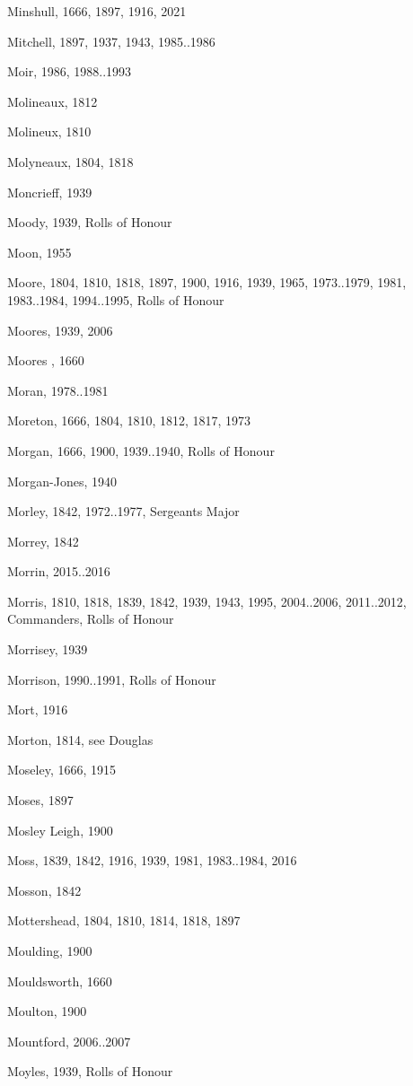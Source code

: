 {\begin{theindex}
\item Minshull, 1666, 1897, 1916, 2021
\item Mitchell, 1897, 1937, 1943, 1985..1986
\item Moir, 1986, 1988..1993
\item Molineaux, 1812
\item Molineux, 1810
\item Molyneaux, 1804, 1818
\item Moncrieff, 1939
\item Moody, 1939, Rolls of Honour
\item Moon, 1955
\item Moore, 1804, 1810, 1818, 1897, 1900, 1916, 1939, 1965, 1973..1979, 1981, 1983..1984, 1994..1995, Rolls of Honour
\item Moores, 1939, 2006
\item Moores , 1660
\item Moran, 1978..1981
\item Moreton, 1666, 1804, 1810, 1812, 1817, 1973
\item Morgan, 1666, 1900, 1939..1940, Rolls of Honour
\item Morgan-Jones, 1940
\item Morley, 1842, 1972..1977, Sergeants Major
\item Morrey, 1842
\item Morrin, 2015..2016
\item Morris, 1810, 1818, 1839, 1842, 1939, 1943, 1995, 2004..2006, 2011..2012, Commanders, Rolls of Honour
\item Morrisey, 1939
\item Morrison, 1990..1991, Rolls of Honour
\item Mort, 1916
\item Morton, 1814, see Douglas
\item Moseley, 1666, 1915
\item Moses, 1897
\item Mosley Leigh, 1900
\item Moss, 1839, 1842, 1916, 1939, 1981, 1983..1984, 2016
\item Mosson, 1842
\item Mottershead, 1804, 1810, 1814, 1818, 1897
\item Moulding, 1900
\item Mouldsworth, 1660
\item Moulton, 1900
\item Mountford, 2006..2007
\item Moyles, 1939, Rolls of Honour

\end{theindex}}
